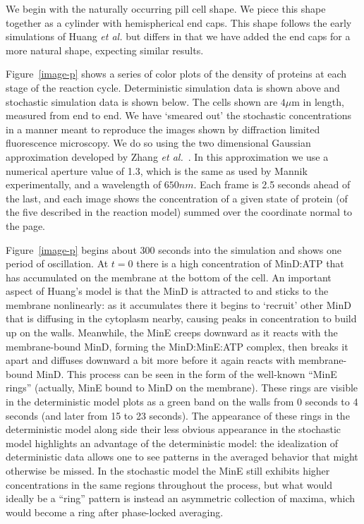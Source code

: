 \documentclass[10pt,letterpaper]{article}
\newcommand\micron{\ensuremath{\mu\text{m}}}
\begin{document}
We begin with the naturally occurring pill cell shape.  We piece this
shape together as a cylinder with hemispherical end caps.  This shape
follows the early simulations of Huang \emph{et al.} but differs in
that we have added the end caps for a more natural shape, expecting
similar results.

Figure~\ref{image-p} shows a series of color plots of the density of
proteins at each stage of the reaction cycle. Deterministic simulation
data is shown above and stochastic simulation data is shown below.
The cells shown are $4\micron$ in length, measured from end to end.
We have `smeared out' the stochastic concentrations in a manner meant
to reproduce the images shown by diffraction limited fluorescence
microscopy.  We do so using the two dimensional Gaussian approximation
developed by Zhang \emph{et al.}~\cite{zhang2007gaussian}.  In this
approximation we use a numerical aperture value of 1.3, which is the
same as used by Mannik experimentally, and a wavelength of $650nm$.
Each frame is 2.5 seconds ahead of the last, and each image shows the
concentration of a given state of protein (of the five described in
the reaction model) summed over the coordinate normal to the page.

Figure~\ref{image-p} begins about 300 seconds into the simulation and
shows one period of oscillation.  At $t=0$ there is a high
concentration of MinD:ATP that has accumulated on the membrane at the
bottom of the cell. An important aspect of Huang's model is that the
MinD is attracted to and sticks to the membrane nonlinearly: as it
accumulates there it begins to `recruit' other MinD that is diffusing
in the cytoplasm nearby, causing peaks in concentration to build up on
the walls.  Meanwhile, the MinE creeps downward as it reacts with the
membrane-bound MinD, forming the MinD:MinE:ATP complex, then breaks it
apart and diffuses downward a bit more before it again reacts with
membrane-bound MinD.  This process can be seen in the form of the
well-known ``MinE rings'' (actually, MinE bound to MinD on the
membrane).  These rings are visible in the deterministic model plots
as a green band on the walls from 0 seconds to 4 seconds (and later
from 15 to 23 seconds).  The appearance of these rings in the
deterministic model along side their less obvious appearance in the
stochastic model highlights an advantage of the deterministic model:
the idealization of deterministic data allows one to see patterns in
the averaged behavior that might otherwise be missed.  In the
stochastic model the MinE still exhibits higher concentrations in the
same regions throughout the process, but what would ideally be a
``ring'' pattern is instead an asymmetric collection of maxima, which
would become a ring after phase-locked averaging.
\end{document}
